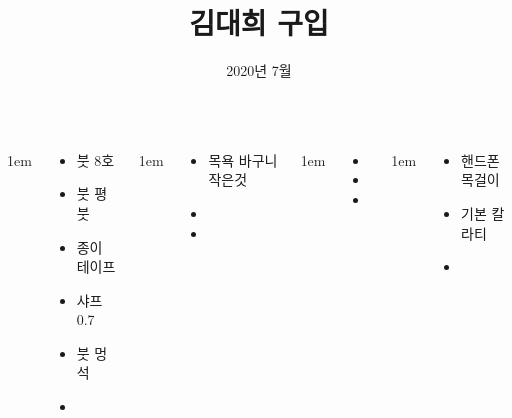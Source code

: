 \documentclass[25pt, a0paper ]{tikzposter}
\title{김대희 구입 }
\author{ 2020년 7월 }
\begin{document}
	\maketitle

	\begin{columns}


			{
					\setlength{\leftmargini}{4em}
					\setlength{\labelsep} {1em}
				\begin{LARGE}
					\begin{itemize}
					\item  붓 8호 
					\item  붓 평붓
					\item  종이 테이프
					\item  샤프 0.7
					\item  붓 멍석
					\item  
					\end{itemize}
				\end{LARGE}
			}


			{
					\setlength{\leftmargini}{4em}
					\setlength{\labelsep} {1em}
				\begin{LARGE}
					\begin{itemize}
					\item 목욕 바구니 작은것
					\item 
					\item 
					\end{itemize}
				\end{LARGE}
			}



			{
					\setlength{\leftmargini}{4em}
					\setlength{\labelsep} {1em}
				\begin{LARGE}
					\begin{itemize}
					\item 
					\item 
					\item 
					\end{itemize}
				\end{LARGE}
			}


			{
					\setlength{\leftmargini}{4em}
					\setlength{\labelsep} {1em}
				\begin{LARGE}
					\begin{itemize}
					\item 핸드폰 목걸이
					\item 기본 칼라티
					\item 
					\end{itemize}
				\end{LARGE}
			}


\end{columns}
\end{document}

